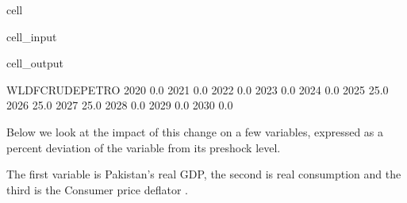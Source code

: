 \documentclass[letterpaper,10pt,english]{jupyterBook}
\begin{document}
\begin{sphinxuseclass}{cell}\begin{sphinxVerbatimInput}

\begin{sphinxuseclass}{cell_input}
\begin{sphinxVerbatim}[commandchars=\\\{\}]
\PYG{p}{[}\PYG{p}{]}
\end{sphinxVerbatim}

\end{sphinxuseclass}\end{sphinxVerbatimInput}
\begin{sphinxVerbatimOutput}

\begin{sphinxuseclass}{cell_output}
\begin{sphinxVerbatim}[commandchars=\\\{\}]
      WLDFCRUDE\PYGZus{}PETRO
2020              0.0
2021              0.0
2022              0.0
2023              0.0
2024              0.0
2025             25.0
2026             25.0
2027             25.0
2028              0.0
2029              0.0
2030              0.0
\end{sphinxVerbatim}

\end{sphinxuseclass}\end{sphinxVerbatimOutput}

\end{sphinxuseclass}
\sphinxAtStartPar
Below we look at the impact of this change on a few variables, expressed as a percent deviation of the variable from its pre\sphinxhyphen{}shock level.

\sphinxAtStartPar
The first variable  is Pakistan’s real GDP, the second  is real consumption and the third is the Consumer price deflator .
\end{document}
